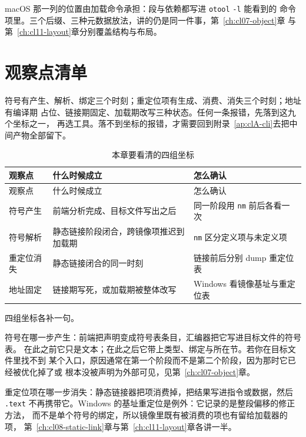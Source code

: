 \documentclass[12pt,a4paper,fontset=fandol]{ctexbook}
\newcommand{\Tool}[1]{\texttt{#1}}
\newcommand{\Sw}[1]{\texttt{#1}}
\newcommand{\Sect}[1]{\texttt{.#1}}
\newcommand{\Win}{\textsf{Windows}}
\newcommand{\Mac}{\textsf{macOS}}
\begin{document}
\Mac{} 那一列的位置由加载命令承担：段与依赖都写进 \Tool{otool} \Sw{-l} 能看到的
命令项里。三个后缀、三种元数据放法，讲的仍是同一件事，第~\ref{ch:cl07-object}章
与第~\ref{ch:cl11-layout}章分别覆盖结构与布局。

\section{观察点清单}\label{sec:cl15-watch}

\begin{guideline}[title={把问题定位到阶段，而不是定位到报错文本}]
符号有产生、解析、绑定三个时刻；重定位项有生成、消费、消失三个时刻；地址有编译期
占位、链接期固定、加载期改写三种状态。任何一条报错，先落到这九个坐标之一，
再选工具。落不到坐标的报错，才需要回到附录~\ref{ap:clA-cli}去把中间产物全部留下。
\end{guideline}

\begin{longtable}{@{}>{\raggedright\arraybackslash}p{} >{\raggedright\arraybackslash}p{} >{\raggedright\arraybackslash}p{}@{}}
\caption{本章要看清的四组坐标}\label{tab:cl15-watch}\\
\toprule
观察点 & 什么时候成立 & 怎么确认 \\
\midrule
\endfirsthead
\toprule
观察点 & 什么时候成立 & 怎么确认 \\
\midrule
\endhead
符号产生 & 前端分析完成、目标文件写出之后 & 同一阶段用 \Tool{nm} 前后各看一次 \\
符号解析 & 静态链接阶段闭合，跨镜像项推迟到加载期 & \Tool{nm} 区分定义项与未定义项 \\
重定位消失 & 静态链接闭合的同一时刻 & 链接前后分别 dump 重定位表 \\
地址固定 & 链接期写死，或加载期被整体改写 & \Win{} 看镜像基址与重定位表 \\
\bottomrule
\end{longtable}

四组坐标各补一句。

符号在哪一步产生：前端把声明变成符号表条目，汇编器把它写进目标文件的符号表。
在此之前它只是文本；在此之后它带上类型、绑定与所在节。若你在目标文件里找不到
某个入口，原因通常在第一个阶段而不是第二个阶段，因为那时它已经被优化掉了或
根本没被声明为外部可见，见第~\ref{ch:cl07-object}章。

重定位项在哪一步消失：静态链接器把项消费掉，把结果写进指令或数据，然后
\Sect{text} 不再携带它。\Win{} 的基址重定位是例外：它记录的是整段偏移的修正方法，
而不是单个符号的绑定，所以镜像里既有被消费的项也有留给加载器的项，
第~\ref{ch:cl08-static-link}章与第~\ref{ch:cl11-layout}章各讲一半。
\end{document}
